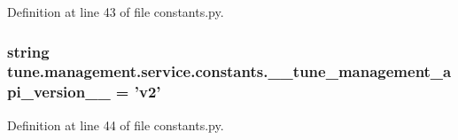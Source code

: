 Definition at line 43 of file constants.\-py.

\hypertarget{namespacetune_1_1management_1_1service_1_1constants_ac90fb32e530083d3a7cff927d9553df8}{
\subsubsection[{\-\_\-\-\_\-tune\-\_\-management\-\_\-api\-\_\-version\-\_\-\-\_\-}]{\setlength{\rightskip}{0pt plus 5cm}string tune.\-management.\-service.\-constants.\-\_\-\-\_\-tune\-\_\-management\-\_\-api\-\_\-version\-\_\-\-\_\- = 'v2'}}\label{namespacetune_1_1management_1_1service_1_1constants_ac90fb32e530083d3a7cff927d9553df8}


Definition at line 44 of file constants.\-py.

